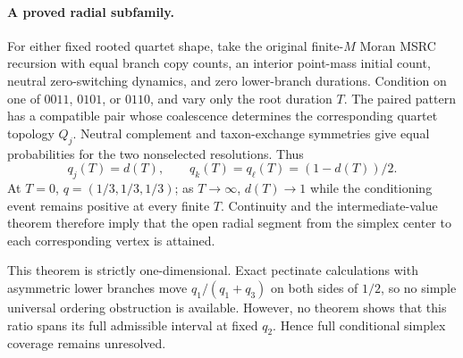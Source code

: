 \paragraph{A proved radial subfamily.}
For either fixed rooted quartet shape, take the original finite-$M$ Moran
MSRC recursion with equal branch copy counts, an interior point-mass initial
count, neutral zero-switching dynamics, and zero lower-branch durations.
Condition on one of $0011$, $0101$, or $0110$, and vary only the root duration
$T$. The paired pattern has a compatible pair whose coalescence determines the
corresponding quartet topology $Q_j$. Neutral complement and taxon-exchange
symmetries give equal probabilities for the two nonselected resolutions.
Thus
\[
q_j(T)=d(T),\qquad q_k(T)=q_\ell(T)=(1-d(T))/2.
\]
At $T=0$, $q=(1/3,1/3,1/3)$; as $T\to\infty$, $d(T)\to1$ while the
conditioning event remains positive at every finite $T$. Continuity and the
intermediate-value theorem therefore imply that the open radial segment from
the simplex center to each corresponding vertex is attained.

This theorem is strictly one-dimensional. Exact pectinate calculations with
asymmetric lower branches move $q_1/(q_1+q_3)$ on both sides of $1/2$, so no
simple universal ordering obstruction is available. However, no theorem shows
that this ratio spans its full admissible interval at fixed $q_2$. Hence full
conditional simplex coverage remains unresolved.
